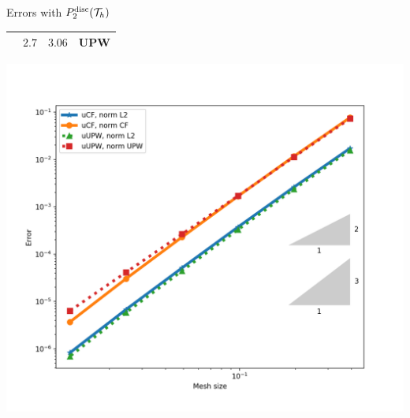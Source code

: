 \begin{frame}{Errors with $\relax{P}^{\text{disc}}_2(\mathcal{T}_h)$}
\begin{minipage}{0.48\textwidth}
\begin{tabular}{|c|c|c|c|}
					& $2.7$ & $3.06$& UPW\\
					\hline
				\end{tabular}
		\end{minipage}
		\hspace*{0.35cm}
		\begin{minipage}{0.48\textwidth}
			\centering
			\includegraphics[scale=0.30]{img/Conveccion_Reaccion/errores_conveccion_reaccion_P2dc.png}
		\end{minipage}
		\end{frame}

